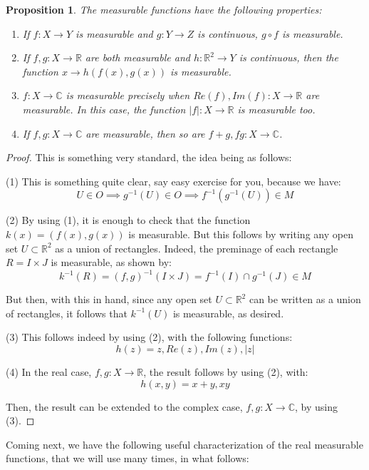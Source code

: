 \documentclass[12pt]{amsbook}
\newtheorem{proposition}[theorem]{Proposition}
\begin{document}
\begin{proposition}
The measurable functions have the following properties:
\begin{enumerate}
\item If $f:X\to Y$ is measurable and $g:Y\to Z$ is continuous, $g\circ f$ is measurable.

\item If $f,g:X\to\mathbb R$ are both measurable and $h:\mathbb R^2\to Y$ is continuous, then the function $x\to h(f(x),g(x))$ is measurable. 

\item $f:X\to\mathbb C$ is measurable precisely when $Re(f),Im(f):X\to\mathbb R$ are measurable. In this case, the function $|f|:X\to\mathbb R$ is measurable too.

\item If $f,g:X\to\mathbb C$ are measurable, then so are $f+g,fg:X\to\mathbb C$. 
\end{enumerate}
\end{proposition}

\begin{proof}
This is something very standard, the idea being as follows:

\medskip

(1) This is something quite clear, say easy exercise for you, because we have:
$$U\in O\implies g^{-1}(U)\in O\implies f^{-1}(g^{-1}(U))\in M$$

(2) By using (1), it is enough to check that the function $k(x)=(f(x),g(x))$ is measurable. But this follows by writing any open set $U\subset\mathbb R^2$ as a union of rectangles. Indeed, the preminage of each rectangle $R=I\times J$ is measurable, as shown by:
$$k^{-1}(R)
=(f,g)^{-1}(I\times J)
=f^{-1}(I)\cap g^{-1}(J)
\in M$$

But then, with this in hand, since any open set $U\subset\mathbb R^2$ can be written as a  union of rectangles, it follows that $k^{-1}(U)$ is measurable, as desired.

\medskip

(3) This follows indeed by using (2), with the following functions:
$$h(z)=z,Re(z),Im(z),|z|$$

(4) In the real case, $f,g:X\to\mathbb R$, the result follows by using (2), with:
$$h(x,y)=x+y,xy$$

Then, the result can be extended to the complex case, $f,g:X\to\mathbb C$, by using (3).
\end{proof}

Coming next, we have the following useful characterization of the real measurable functions, that we will use many times, in what follows:
\end{document}
